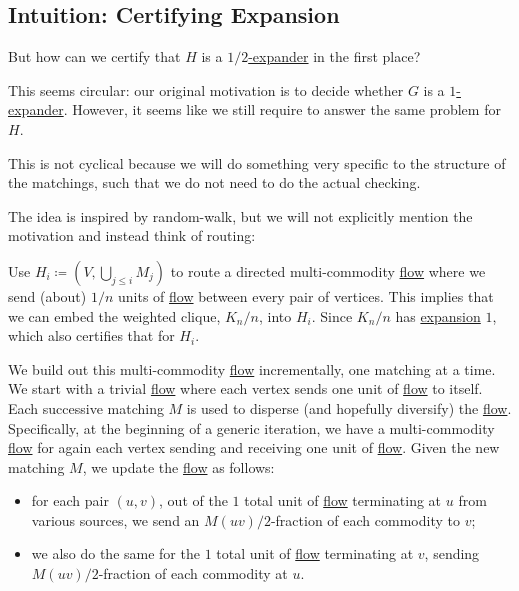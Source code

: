 \subsection{Intuition: Certifying Expansion}
But how can we certify that \(H\) is a \hyperref[def:expander]{\(1 / 2\)-expander} in the first place?

\begin{problem*}
	This seems circular: our original motivation is to decide whether \(G\) is a \hyperref[def:expander]{\(1\)-expander}. However, it seems like we still require to answer the same problem for \(H\).
\end{problem*}
\begin{answer}
	This is not cyclical because we will do something very specific to the structure of the matchings, such that we do not need to do the actual checking.
\end{answer}

The idea is inspired by random-walk, but we will not explicitly mention the motivation and instead think of routing:

\begin{intuition}
	Use \(H_i \coloneqq (V, \bigcup_{j \leq i} M_j)\) to route a directed multi-commodity \hyperref[def:flow]{flow} where we send (about) \(1 / n\) units of \hyperref[def:flow]{flow} between every pair of vertices. This implies that we can embed the weighted clique, \(K_n / n\), into \(H_i\). Since \(K_n / n\) has \hyperref[def:expansion]{expansion} \(1\), which also certifies that for \(H_i\).
\end{intuition}

We build out this multi-commodity \hyperref[def:flow]{flow} incrementally, one matching at a time. We start with a trivial \hyperref[def:flow]{flow} where each vertex sends one unit of \hyperref[def:flow]{flow} to itself. Each successive matching \(M\) is used to disperse (and hopefully diversify) the \hyperref[def:flow]{flow}. Specifically, at the beginning of a generic iteration, we have a multi-commodity \hyperref[def:flow]{flow} for again each vertex sending and receiving one unit of \hyperref[def:flow]{flow}. Given the new matching \(M\), we update the \hyperref[def:flow]{flow} as follows:
\begin{itemize}
	\item for each pair \((u, v)\), out of the \(1\) total unit of \hyperref[def:flow]{flow} terminating at \(u\) from various sources, we send an \(M(uv) / 2\)-fraction of each commodity to \(v\);
	\item we also do the same for the \(1\) total unit of \hyperref[def:flow]{flow} terminating at \(v\), sending \(M(uv) / 2\)-fraction of each commodity at \(u\).
\end{itemize}

